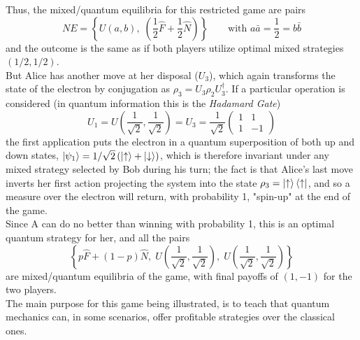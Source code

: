 Thus, the mixed/quantum equilibria for this restricted game are pairs
\[ NE = \left\{ U(a,b), \;\left(\frac{1}{2}\hat{F}+\frac{1}{2}\hat{N}\right) \right\} \qquad \text{with  } a\bar{a}=\frac{1}{2}=b\bar{b}	 \]
and the outcome is the same as if both players utilize optimal mixed strategies $(1/2,1/2)$.\\
But Alice has another move at her disposal ($U_3$), which again transforms the state of the electron by conjugation as $\rho_3=U_3\rho_2U_3^\dagger$. If a particular operation is considered (in quantum information this is the \textit{Hadamard Gate})
\[ U_1 = U\left(\frac{1}{\sqrt{2}},\frac{1}{\sqrt{2}}\right) = U_3 = \frac{1}{\sqrt{2}}\begin{pmatrix} 1&1\\1&-1\end{pmatrix} \]
the first application puts the electron in a quantum superposition of both up and down states, $\ket{\psi_1} = 1/\sqrt{2}\left(\ket{\uparrow}+\ket{\downarrow}\right)$, which is therefore invariant under any mixed strategy selected by Bob during his turn; the fact is that Alice's last move inverts her first action projecting the system into the state $\rho_3=\ket{\uparrow}\bra{\uparrow}$, and so a measure over the electron will return, with probability 1, "spin-up" at the end of the game. \\
Since A can do no better than winning with probability 1, this is an optimal quantum strategy for her, and all the pairs 
\[ \left\{ p\hat{F}+(1-p)\hat{N}, \; U\left(\frac{1}{\sqrt{2}},\frac{1}{\sqrt{2}}\right), \; U\left(\frac{1}{\sqrt{2}},\frac{1}{\sqrt{2}}\right) \right\} \]
are mixed/quantum equilibria of the game, with final payoffs of $(1,-1)$ for the two players.\\
The main purpose for this game being illustrated, is to teach that quantum mechanics can, in some scenarios, offer profitable strategies over the classical ones.




















